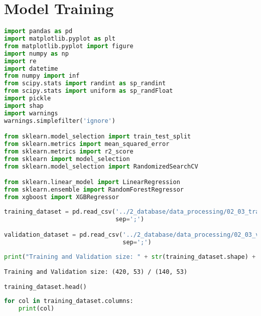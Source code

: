 \hypertarget{model-training}{%
\section{Model Training}\label{model-training}}

\begin{lstlisting}[language=Python]
import pandas as pd
import matplotlib.pyplot as plt
from matplotlib.pyplot import figure
import numpy as np
import re
import datetime
from numpy import inf
from scipy.stats import randint as sp_randint
from scipy.stats import uniform as sp_randFloat
import pickle
import shap
import warnings
warnings.simplefilter('ignore')

from sklearn.model_selection import train_test_split
from sklearn.metrics import mean_squared_error
from sklearn.metrics import r2_score
from sklearn import model_selection
from sklearn.model_selection import RandomizedSearchCV

from sklearn.linear_model import LinearRegression
from sklearn.ensemble import RandomForestRegressor
from xgboost import XGBRegressor
\end{lstlisting}

\begin{lstlisting}[language=Python]
training_dataset = pd.read_csv('../2_database/data_processing/02_03_training_dataset.csv',
                               sep=';')

validation_dataset = pd.read_csv('../2_database/data_processing/02_03_validation_dataset.csv',
                                 sep=';')
\end{lstlisting}

\begin{lstlisting}[language=Python]
print("Training and Validation size: " + str(training_dataset.shape) + " / " + str(validation_dataset.shape))
\end{lstlisting}

\begin{lstlisting}
Training and Validation size: (420, 53) / (140, 53)
\end{lstlisting}

\begin{lstlisting}[language=Python]
training_dataset.head()
\end{lstlisting}

\begin{lstlisting}[language=Python]
for col in training_dataset.columns:
    print(col)
\end{lstlisting}

